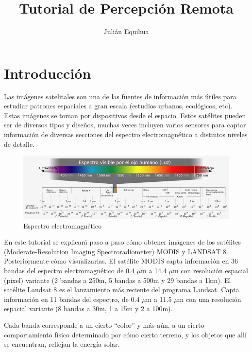 \documentclass[11pt,spanish]{article}
\title{Tutorial de Percepción Remota}
\author{Julián Equihua}
\begin{document}
\section{Introducción}

Las imágenes satelitales son una de las fuentes de información más útiles para estudiar patrones espaciales a gran escala (estudios urbanos, ecológicos, etc). Estas imágenes se toman por dispositivos desde el espacio. Estos satélites pueden ser de diversos tipos y diseños, muchas veces incluyen varios sensores para captar información de diversas secciones del espectro electromagnético a distintos niveles de detalle.

\begin{figure}[ht]
\centering
\includegraphics[width=5in]{1_espectro.png}
\caption{Espectro electromagnético}
\end{figure}
 
En este tutorial se explicará paso a paso cómo obtener imágenes de los satélites (Moderate-Resolution Imaging Spectroradiometer) MODIS y LANDSAT 8. Posteriormente cómo visualizarlas. El satélite MODIS capta información en 36 bandas del espectro electromagnético de 0.4 $\mu$m a 14.4 $\mu$m con resolución espacial (pixel) variante (2 bandas a 250m, 5 bandas a 500m y 29 bandas a 1km). El satélite Landsat 8 es el lanzamiento más reciente del programa Landsat. Capta información en 11 bandas del espectro, de 0.4 $\mu$m a 11.5 $\mu$m con una resolución espacial variante (8 bandas a 30m, 1 a 15m y 2 a 100m).

\newpage

Cada banda corresponde a un cierto "`color"' y más aún, a un cierto comportamiento físico determinado por cómo cierto terreno, y los objetos que allí se encuentran, reflejan la energía solar.
\end{document}
